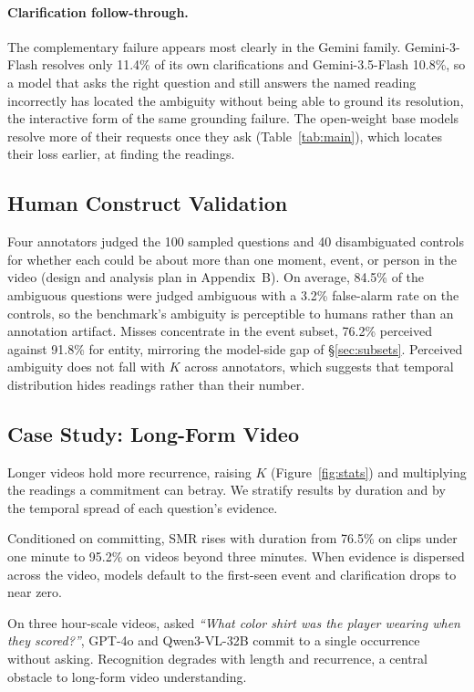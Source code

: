 \paragraph{Clarification follow-through.} The complementary failure appears most clearly in the Gemini family. Gemini-3-Flash resolves only 11.4\% of its own clarifications and Gemini-3.5-Flash 10.8\%, so a model that asks the right question and still answers the named reading incorrectly has located the ambiguity without being able to ground its resolution, the interactive form of the same grounding failure. The open-weight base models resolve more of their requests once they ask (Table~\ref{tab:main}), which locates their loss earlier, at finding the readings.

\subsection{Human Construct Validation}
\label{sec:humanstudy}

Four annotators judged the 100 sampled questions and 40 disambiguated controls for whether each could be about more than one moment, event, or person in the video (design and analysis plan in Appendix~B). On average, 84.5\% of the ambiguous questions were judged ambiguous with a 3.2\% false-alarm rate on the controls, so the benchmark's ambiguity is perceptible to humans rather than an annotation artifact. Misses concentrate in the event subset, 76.2\% perceived against 91.8\% for entity, mirroring the model-side gap of \S\ref{sec:subsets}. Perceived ambiguity does not fall with $K$ across annotators, which suggests that temporal distribution hides readings rather than their number.

\subsection{Case Study: Long-Form Video}
\label{sec:casestudy}

Longer videos hold more recurrence, raising $K$ (Figure~\ref{fig:stats}) and multiplying the readings a commitment can betray. We stratify results by duration and by the temporal spread of each question's evidence.

Conditioned on committing, SMR rises with duration from 76.5\% on clips under one minute to 95.2\% on videos beyond three minutes. When evidence is dispersed across the video, models default to the first-seen event and clarification drops to near zero.

On three hour-scale videos, asked \textit{``What color shirt was the player wearing when they scored?''}, GPT-4o and Qwen3-VL-32B commit to a single occurrence without asking. Recognition degrades with length and recurrence, a central obstacle to long-form video understanding.
